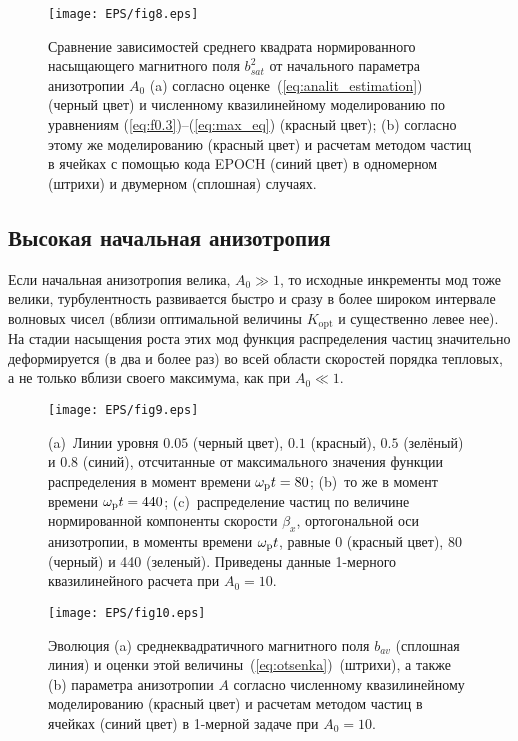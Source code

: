 \begin{figure}[t]
\centering
\texttt{[image: EPS/fig8.eps]}
\caption{Сравнение зависимостей среднего квадрата нормированного насыщающего магнитного поля $b_{sat}^2$ от начального параметра анизотропии $A_0$ (a) согласно оценке~(\ref{eq:analit_estimation}) (черный цвет) и численному квазилинейному моделированию по уравнениям (\ref{eq:f0.3})--(\ref{eq:max_eq}) (красный цвет); (b) согласно этому же моделированию (красный цвет) и расчетам методом частиц в ячейках с помощью кода EPOCH (синий цвет) в одномерном (штрихи) и двумерном (сплошная) случаях.}
\label{fig:bsat}
\end{figure}


\subsection{Высокая начальная анизотропия}\label{subsec:high_A_1d}

Если начальная анизотропия велика, $A_0\gg 1$, то исходные инкременты мод тоже велики, турбулентность развивается быстро и сразу в более широком интервале волновых чисел (вблизи оптимальной величины $K_\mathrm{opt}$ и существенно левее нее). На стадии насыщения роста этих мод функция распределения частиц значительно деформируется (в два и более раз) во всей области скоростей порядка тепловых, а не только вблизи своего максимума, как при $A_0\ll 1$. 
\begin{figure}[b]
\centering
\texttt{[image: EPS/fig9.eps]}
\caption{(a)~Линии уровня $0.05$ (черный цвет), $0.1$ (красный), $0.5$ (зелёный) и $0.8$ (синий), отсчитанные от максимального значения функции распределения в момент времени $\omega_\mathrm{p} t =80$; (b)~то же в момент времени $\omega_\mathrm{p} t =440$; (c)~распределение частиц по величине нормированной компоненты скорости $\beta_x$, ортогональной оси анизотропии, в моменты времени $\omega_\mathrm{p} t$, равные 0 (красный цвет), 80 (черный) и 440 (зеленый). Приведены данные 1-мерного квазилинейного расчета при $A_0=10$.}
\label{fig:sravnenie_FR1d_A10}
\end{figure}
\begin{figure}[b]
\centering
\texttt{[image: EPS/fig10.eps]}
\caption{Эволюция (a) среднеквадратичного магнитного поля $b_{av}$ (сплошная линия) и оценки этой величины~(\ref{eq:otsenka})~(штрихи), а также (b) параметра анизотропии $A$ согласно численному квазилинейному моделированию (красный цвет) и расчетам методом частиц в ячейках (синий цвет) в 1-мерной задаче при $A_0=10$.}
\label{fig:evol1d_QL_A10}
\end{figure}

